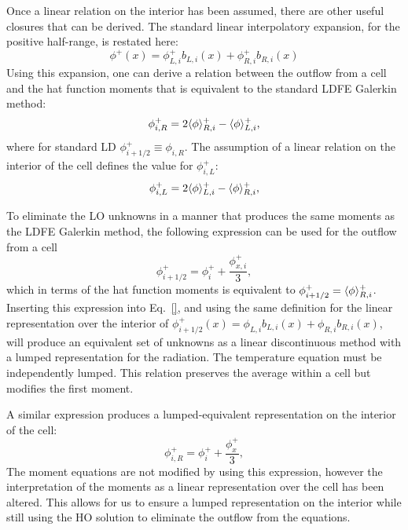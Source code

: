 Once a linear relation on the interior has been assumed, there are other useful closures that can be
derived.  The standard linear interpolatory expansion, for the positive half-range, is restated here:
\begin{equation}
\phi^+(x) = \phi^+_{L,i} b_{L,i}(x) + \phi^+_{R,i} b_{R,i}(x)
\end{equation}
Using this expansion, one can derive a relation between the outflow from a cell and the
hat function moments that is equivalent to the standard LDFE Galerkin method:
\begin{equation}
    \phi_{i,R}^+ = 2 \langle \phi \rangle_{R,i}^+ - \langle \phi \rangle_{L,i}^+,
\end{equation}
where for standard LD $\phi_{i+1/2}^+\equiv\phi_{i,R}$.  The assumption of a linear relation on the interior
of the cell defines the value for $\phi_{i,L}^+$:
\begin{equation}
    \phi_{i,L}^+ = 2 \langle \phi \rangle_{L,i}^+ - \langle \phi \rangle_{R,i}^+,
\end{equation}

To eliminate the LO unknowns in a manner that produces the same moments as the LDFE
Galerkin method, the
following expression can be used for the outflow from a cell
\begin{equation}
    \phi_{i+1/2}^+ = \phi_i^+ + \frac{\phi_{x,i}^+}{3},
\end{equation}
which in terms of the hat function moments is equivalent to $\phi_{i+1/2}^+ =
\langle \phi \rangle_{R,i}^+$.  Inserting this expression into Eq.~\eqref{}, and using the same
definition for the linear representation over the interior of $\phi_{i+1/2}^+(x) =
\phi_{L,i} b_{L,i}(x) + \phi_{R,i} b_{R,i}(x)$, will produce an equivalent set of unknowns
as a linear discontinuous method with a lumped representation for the radiation.  The
temperature equation must be independently lumped. This
relation preserves the average within a cell but modifies the first moment.  

A similar expression produces a lumped-equivalent representation on the interior of the cell:
\begin{equation}
    \phi_{i,R}^+ = \phi_i^+ + \frac{\phi_x^+}{3},
\end{equation}
The moment equations are not modified by using this expression, however the interpretation
of the moments as a linear representation over the cell has been altered.  This allows for
us to ensure a lumped representation on the interior while still using the HO solution to
eliminate the outflow from the equations.


